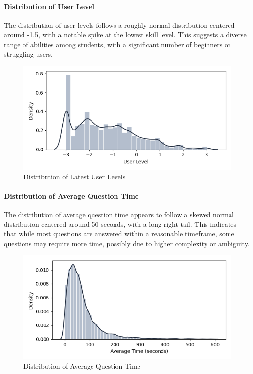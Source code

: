 \documentclass[
    a4paper, %
    10pt, %
    twoside, %
]{LTJournalArticle}
\begin{document}
\paragraph{Distribution of User Level}
The distribution of user levels follows a roughly normal distribution centered around -1.5, with a notable spike at the lowest skill level. This suggests a diverse range of abilities among students, with a significant number of beginners or struggling users.

\begin{figure}[H]
    \centering
    \includegraphics[width=\columnwidth]{images/user_level_dist.png}
    \caption{Distribution of Latest User Levels}
    \label{fig:user-level-dist}
\end{figure}

\paragraph{Distribution of Average Question Time}
The distribution of average question time appears to follow a skewed normal distribution centered around 50 seconds, with a long right tail. This indicates that while most questions are answered within a reasonable timeframe, some questions may require more time, possibly due to higher complexity or ambiguity.

\begin{figure}[H]
    \centering
    \includegraphics[width=\columnwidth]{images/avg_time_distribution.png}
    \caption{Distribution of Average Question Time}
    \label{fig:avg-time-dist}
\end{figure}
\end{document}
